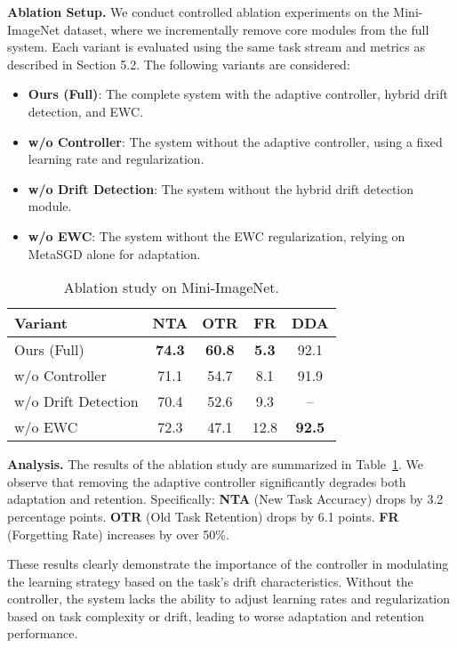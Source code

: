 \documentclass[conference]{IEEEtran}
\begin{document}
\textbf{Ablation Setup.}  
We conduct controlled ablation experiments on the Mini-ImageNet dataset, where we incrementally remove core modules from the full system. Each variant is evaluated using the same task stream and metrics as described in Section 5.2. The following variants are considered:
\begin{itemize}
    \item \textbf{Ours (Full)}: The complete system with the adaptive controller, hybrid drift detection, and EWC.
    \item \textbf{w/o Controller}: The system without the adaptive controller, using a fixed learning rate and regularization.
    \item \textbf{w/o Drift Detection}: The system without the hybrid drift detection module.
    \item \textbf{w/o EWC}: The system without the EWC regularization, relying on MetaSGD alone for adaptation.
\end{itemize}

\begin{table}[ht]
\centering
\caption{Ablation study on Mini-ImageNet.}
\begin{tabular}{lcccc}
\toprule
\textbf{Variant} & \textbf{NTA} & \textbf{OTR} & \textbf{FR} & \textbf{DDA} \\
\midrule
Ours (Full)                  & \textbf{74.3} & \textbf{60.8} & \textbf{5.3} & 92.1 \\
\quad w/o Controller         & 71.1 & 54.7 & 8.1  & 91.9 \\
\quad w/o Drift Detection    & 70.4 & 52.6 & 9.3  & --   \\
\quad w/o EWC                & 72.3 & 47.1 & 12.8 & \textbf{92.5} \\
\bottomrule
\end{tabular}
\label{tab:ablation_mini}
\end{table}


\textbf{Analysis.}  
The results of the ablation study are summarized in Table~\ref{tab:ablation_mini}. We observe that removing the adaptive controller significantly degrades both adaptation and retention. Specifically:
\textbf{NTA} (New Task Accuracy) drops by 3.2 percentage points.
\textbf{OTR} (Old Task Retention) drops by 6.1 points.
\textbf{FR} (Forgetting Rate) increases by over 50\%.

These results clearly demonstrate the importance of the controller in modulating the learning strategy based on the task's drift characteristics. Without the controller, the system lacks the ability to adjust learning rates and regularization based on task complexity or drift, leading to worse adaptation and retention performance.
\end{document}
